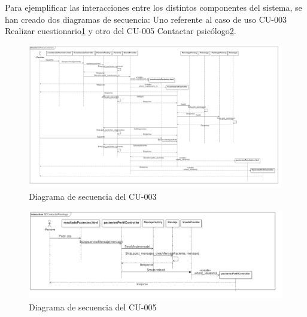 Para ejemplificar las interacciones entre los distintos componentes del sistema, se han creado dos diagramas de secuencia: Uno referente al caso de uso CU-003 Realizar cuestionario\ref{fig:diag_sec_cu003} y otro del CU-005 Contactar psicólogo\ref{fig:diag_sec_cu005}.


\begin{landscape}

\begin{figure}[htbp] 
    \centering
    \includegraphics[height=0.8\textwidth,keepaspectratio]{figuras/diagrama/SDRealizarCuestionario.png}
    \caption{Diagrama de secuencia del CU-003}
    \label{fig:diag_sec_cu003}
\end{figure}	

\end{landscape}


\begin{figure}[htbp] 
    \centering
    \includegraphics[width=1\textwidth]{figuras/diagrama/SDContactarPsicologo.png}
    \caption{Diagrama de secuencia del CU-005}
    \label{fig:diag_sec_cu005}
\end{figure}	